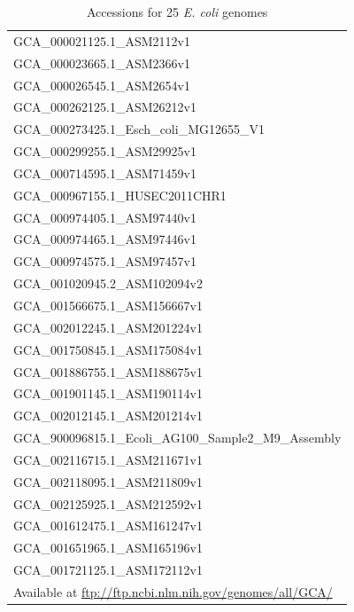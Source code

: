 \documentclass[10pt]{article}
\begin{document}
\begin{table}[]
\centering
\caption{Accessions for 25 \textit{E. coli} genomes}
\label{table:accessions}
\begin{tabular}{l}
  \toprule
  GCA\_000021125.1\_ASM2112v1 \\
  GCA\_000023665.1\_ASM2366v1 \\
  GCA\_000026545.1\_ASM2654v1 \\
  GCA\_000262125.1\_ASM26212v1 \\
  GCA\_000273425.1\_Esch\_coli\_MG12655\_V1 \\
  GCA\_000299255.1\_ASM29925v1 \\
  GCA\_000714595.1\_ASM71459v1 \\
  GCA\_000967155.1\_HUSEC2011CHR1 \\
  GCA\_000974405.1\_ASM97440v1 \\
  GCA\_000974465.1\_ASM97446v1 \\
  GCA\_000974575.1\_ASM97457v1 \\
  GCA\_001020945.2\_ASM102094v2 \\
  GCA\_001566675.1\_ASM156667v1 \\
  GCA\_002012245.1\_ASM201224v1 \\
  GCA\_001750845.1\_ASM175084v1 \\
  GCA\_001886755.1\_ASM188675v1 \\
  GCA\_001901145.1\_ASM190114v1 \\
  GCA\_002012145.1\_ASM201214v1 \\
  GCA\_900096815.1\_Ecoli\_AG100\_Sample2\_M9\_Assembly \\
  GCA\_002116715.1\_ASM211671v1 \\
  GCA\_002118095.1\_ASM211809v1 \\
  GCA\_002125925.1\_ASM212592v1 \\
  GCA\_001612475.1\_ASM161247v1 \\
  GCA\_001651965.1\_ASM165196v1 \\
  GCA\_001721125.1\_ASM172112v1\\
  \bottomrule
  {\tiny   Available at \url{ftp://ftp.ncbi.nlm.nih.gov/genomes/all/GCA/}}

\end{tabular}
\end{table}
\end{document}
